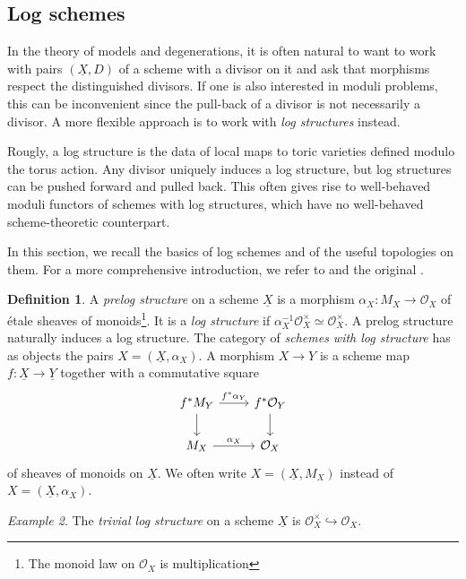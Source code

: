 \documentclass[a4paper,11pt]{amsart} %
\numberwithin{equation}{subsection}
\newcommand{\ca}[1]{{\mathcal{#1}}}
\newcommand{\ul}[1]{{\underline{#1}}}
\newcommand{\hra}{\hookrightarrow}
\theoremstyle{definition}
\newtheorem{definition}{Definition}[section]
\theoremstyle{plain}%
\theoremstyle{remark}
\newtheorem{example}[definition]{Example}
\begin{document}
\subsection{Log schemes}\label{log sch etc}

In the theory of models and degenerations, it is often natural to want to work with pairs $(\ul X,D)$ of a scheme with a divisor on it and ask that morphisms respect the distinguished divisors. If one is also interested in moduli problems, this can be inconvenient since the pull-back of a divisor is not necessarily a divisor. A more flexible approach is to work with \emph{log structures} instead.

Rougly, a log structure is the data of local maps to toric varieties defined modulo the torus action. Any divisor uniquely induces a log structure, but log structures can be pushed forward and pulled back. This often gives rise to well-behaved moduli functors of schemes with log structures, which have no well-behaved scheme-theoretic counterpart.

In this section, we recall the basics of log schemes and of the useful topologies on them. For a more comprehensive introduction, we refer to \cite{Ogus2018Lectures} and the original \cite{Kato} . 


\begin{definition}
    A \emph{prelog structure} on a scheme $\ul X$ is a morphism $\alpha_X\colon M_X \to \ca O_X$ of \'etale sheaves of monoids\footnote{The monoid law on $\ca O_X$ is multiplication}. It is a \emph{log structure} if $\alpha_X^{-1}\ca O_X^\times \simeq {\ca O}_X^\times$. A prelog structure naturally induces a log structure. The category of \emph{schemes with log structure} has as objects the pairs $X=(\ul X,\alpha_X)$. A morphism $X \to Y$ is a scheme map $f \colon \ul X \to \ul Y$ together with a commutative square
\[
\begin{tikzcd}
f^*M_Y \arrow{r}{f^*\alpha_Y} \arrow[swap]{d}{} & f^*\mathcal{O}_Y\arrow{d}{} \\
M_X  \arrow{r}{\alpha_X} & \mathcal{O}_X
\end{tikzcd}
\]
of sheaves of monoids on $\ul X$. We often write $X=(\ul X,M_X)$ instead of $X=(\ul X,\alpha_X)$.
\end{definition}

\begin{example}\label{trivial_log}
    The \emph{trivial log structure} on a scheme $\ul X$ is $\ca O_X^\times \hra \ca O_X$. 
\end{example}
\end{document}

